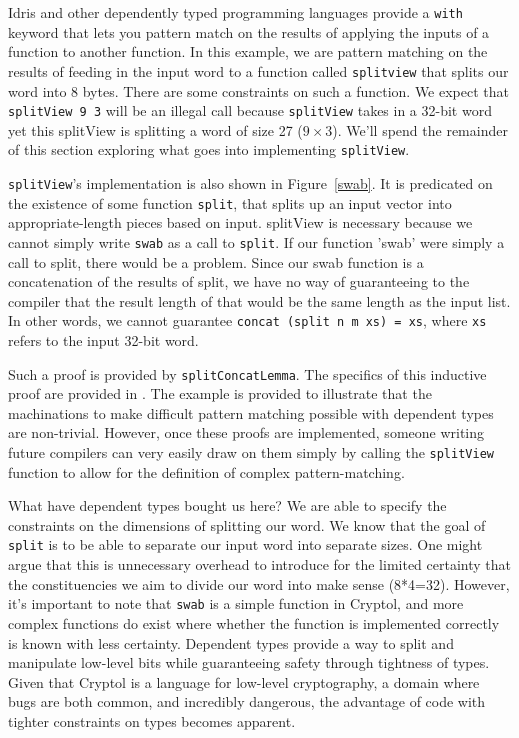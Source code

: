 Idris and other dependently typed programming languages provide a \texttt{with}
keyword that lets you pattern match on the results of applying the inputs of a
function to another function. In this example, we are pattern matching on the
results of feeding in the input word to a function called \texttt{splitview}
that splits our word into 8 bytes. There are some constraints on such a
function. We expect that \texttt{splitView 9 3} will be an illegal call because
\texttt{splitView} takes in a 32-bit word yet this splitView is splitting a word
of size 27 ($9 \times 3$). We'll spend the remainder of this section exploring
what goes into implementing \texttt{splitView}. 

\texttt{splitView}'s implementation is also shown in Figure~\ref{swab}. It is
predicated on the existence of some function \texttt{split}, that splits up an
input vector into appropriate-length pieces based on input. splitView is
necessary because we cannot simply write \texttt{swab} as a call to
\texttt{split}. If our function 'swab' were simply a call to split, there would
be a problem. Since our swab function is a concatenation of the results of
split, we have no way of guaranteeing to the compiler that the result length of
that would be the same length as the input list. In other words, we cannot
guarantee \texttt{concat (split n m xs) = xs}, where \texttt{xs} refers to the
input 32-bit word. 

Such a proof is provided by \texttt{splitConcatLemma}. The specifics of this
inductive proof are provided in \cite{power_of_pi}. The example is provided to
illustrate that the machinations to make difficult pattern matching possible
with dependent types are non-trivial. However, once these proofs are
implemented, someone writing future compilers can very easily draw on them
simply by calling the \texttt{splitView} function to allow for the definition of
complex pattern-matching. 

What have dependent types bought us here? We are able to specify the constraints
on the dimensions of splitting our word. We know that the goal of
\texttt{split} is to be able to separate our input word into separate sizes. One
might argue that this is unnecessary overhead to introduce for the limited
certainty that the constituencies we aim to divide our word into make sense
(8*4=32). However, it's important to note that \texttt{swab} is a simple
function in Cryptol, and more complex functions do exist where whether the
function is implemented correctly is known with less certainty. Dependent types
provide a way to split and manipulate low-level bits while guaranteeing safety
through tightness of types. Given that Cryptol is a language for low-level
cryptography, a domain where bugs are both common, and incredibly dangerous, the
advantage of code with tighter constraints on types becomes apparent. 